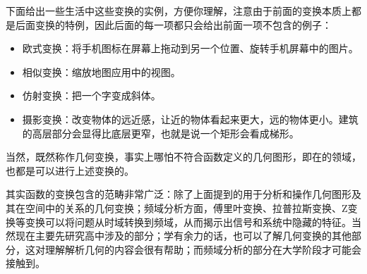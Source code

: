 下面给出一些生活中这些变换的实例，方便你理解，注意由于前面的变换本质上都是后面变换的特例，因此后面的每一项都只会给出前面一项不包含的例子：

\begin{itemize}
\item 欧式变换：将手机图标在屏幕上拖动到另一个位置、旋转手机屏幕中的图片。
\item 相似变换：缩放地图应用中的视图。
\item 仿射变换：把一个字变成斜体。
\item 摄影变换：改变物体的远近感，让近的物体看起来更大，远的物体更小。建筑的高层部分会显得比底层更窄，也就是说一个矩形会看成梯形。
\end{itemize}

当然，既然称作几何变换，事实上哪怕不符合函数定义的几何图形，即在的领域，也都是可以进行上述变换的。

其实函数的变换包含的范畴非常广泛：除了上面提到的用于分析和操作几何图形及其在空间中的关系的几何变换；频域分析方面，傅里叶变换、拉普拉斯变换、Z变换等变换可以将问题从时域转换到频域，从而揭示出信号和系统中隐藏的特征。当然现在主要先研究高中涉及的部分；学有余力的话，也可以了解几何变换的其他部分，这对理解解析几何的内容会很有帮助；而频域分析的部分在大学阶段才可能会接触到。
